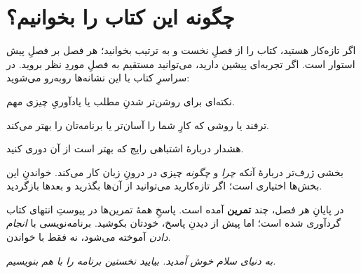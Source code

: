 \section*{چگونه این کتاب را بخوانیم؟}

اگر تازه‌کار هستید، کتاب را از فصلِ نخست و به ترتیب بخوانید؛ هر فصل بر فصلِ پیش
استوار است. اگر تجربه‌ای پیشین دارید، می‌توانید مستقیم به فصلِ موردِ نظر بروید.
در سراسرِ کتاب با این نشانه‌ها روبه‌رو می‌شوید:

\begin{note}
نکته‌ای برای روشن‌تر شدنِ مطلب یا یادآوریِ چیزی مهم.
\end{note}

\begin{tip}
ترفند یا روشی که کارِ شما را آسان‌تر یا برنامه‌تان را بهتر می‌کند.
\end{tip}

\begin{warn}
هشدار دربارهٔ اشتباهی رایج که بهتر است از آن دوری کنید.
\end{warn}

\begin{deep}
بخشی ژرف‌تر دربارهٔ آنکه \emph{چرا} و \emph{چگونه} چیزی در درونِ زبان کار
می‌کند. خواندنِ این بخش‌ها اختیاری است؛ اگر تازه‌کارید می‌توانید از آن‌ها بگذرید
و بعدها بازگردید.
\end{deep}

در پایانِ هر فصل، چند \textbf{تمرین} آمده است. پاسخِ همهٔ تمرین‌ها در پیوستِ
انتهای کتاب گردآوری شده است؛ اما پیش از دیدنِ پاسخ، خودتان بکوشید. برنامه‌نویسی
با \emph{انجام دادن} آموخته می‌شود، نه فقط با خواندن.

\vspace{0.5cm}
\begin{center}
\emph{به دنیای سلام خوش آمدید. بیایید نخستین برنامه را با هم بنویسیم.}
\end{center}
\clearpage
